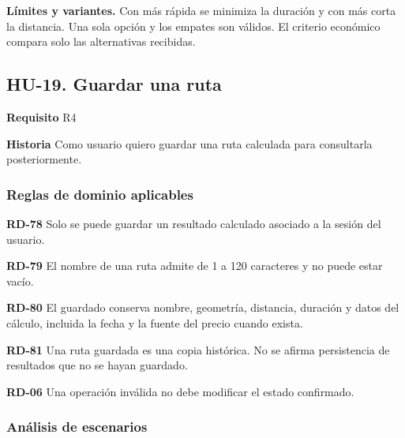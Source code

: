 {\fontsize{9}{11.8}\selectfont\textbf{Límites y variantes.} Con más rápida se minimiza la duración y con más corta la distancia. Una sola opción y los empates son válidos. El criterio económico compara solo las alternativas recibidas.\par}\vspace{4pt}
\clearpage\subsection*{HU-19. Guardar una ruta}

\textbf{Requisito} R4\par

\textbf{Historia} Como usuario quiero guardar una ruta calculada para consultarla posteriormente.\par

\subsubsection*{Reglas de dominio aplicables}

\textbf{RD-78} Solo se puede guardar un resultado calculado asociado a la sesión del usuario.\par

\textbf{RD-79} El nombre de una ruta admite de 1 a 120 caracteres y no puede estar vacío.\par

\textbf{RD-80} El guardado conserva nombre, geometría, distancia, duración y datos del cálculo, incluida la fecha y la fuente del precio cuando exista.\par

\textbf{RD-81} Una ruta guardada es una copia histórica. No se afirma persistencia de resultados que no se hayan guardado.\par

\textbf{RD-06} Una operación inválida no debe modificar el estado confirmado.\par

\subsubsection*{Análisis de escenarios}

